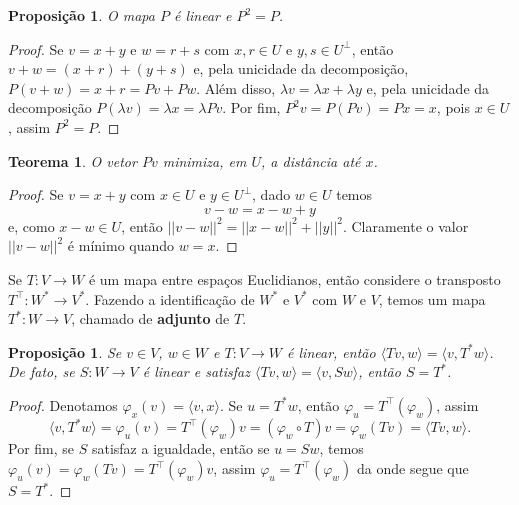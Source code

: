 \documentclass{article}
\newtheorem{proposition}[definition]{Proposição}
\newtheorem{theorem}[definition]{Teorema}
\renewcommand{\phi}{\varphi}
\begin{document}
\begin{proposition}
    O mapa $P$ é linear e $P^2 = P$.
\end{proposition}
\begin{proof}
    Se $v = x + y$ e $w = r + s$ com $x, r \in U$ e $y, s \in U^\perp$, então $v + w = (x + r) + (y + s)$ e, pela unicidade da decomposição, $P(v + w) = x + r = Pv + Pw$. Além disso, $\lambda v = \lambda x + \lambda y$ e, pela unicidade da decomposição $P(\lambda v) = \lambda x = \lambda Pv$. Por fim, $P^2v = P(Pv) = Px = x$, pois $x \in U$, assim $P^2 = P$.
\end{proof}

\begin{theorem}
    O vetor $Pv$ minimiza, em $U$, a distância até $x$.
\end{theorem}
\begin{proof}
    Se $v = x + y$ com $x \in U$ e $y \in U^\perp$, dado $w \in U$ temos \begin{equation}
        v - w = x - w + y
    \end{equation} e, como $x - w \in U$, então $||v - w||^2 = ||x - w||^2 + ||y||^2$. Claramente o valor $||v - w||^2$ é mínimo quando $w = x$.
\end{proof}

Se $T \colon V \to W$ é um mapa entre espaços Euclidianos, então considere o transposto $T^\top \colon W^* \to V^*$. Fazendo a identificação de $W^*$ e $V^*$ com $W$ e $V$, temos um mapa $T^* \colon W \to V$, chamado de \textbf{adjunto} de $T$.

\begin{proposition}
    Se $v \in V$, $w \in W$ e $T \colon V \to W$ é linear, então $\langle Tv, w \rangle = \langle v, T^*w \rangle$. De fato, se $S \colon W \to V$ é linear e satisfaz $\langle Tv, w \rangle = \langle v, Sw \rangle$, então $S = T^*$.
\end{proposition}
\begin{proof}
    Denotamos $\phi_x(v) = \langle v, x \rangle$. Se $u = T^*w$, então $\phi_u = T^\top(\phi_w)$, assim \begin{equation}
        \langle v, T^*w \rangle = \phi_u(v) = T^\top(\phi_w)v = (\phi_w \circ T)v = \phi_w(Tv) = \langle Tv, w \rangle.
    \end{equation}
    Por fim, se $S$ satisfaz a igualdade, então se $u = Sw$, temos $\phi_u(v) = \phi_w(Tv) = T^\top(\phi_w)v$, assim $\phi_u = T^\top(\phi_w)$ da onde segue que $S = T^*$.
\end{proof}
\end{document}

